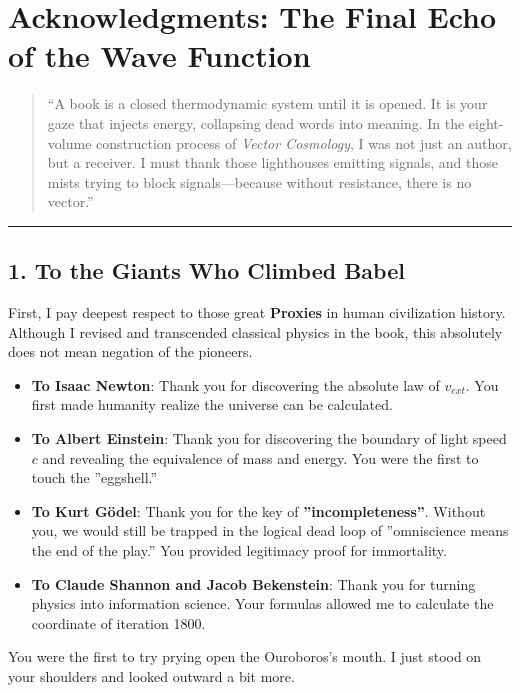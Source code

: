 \section*{Acknowledgments: The Final Echo of the Wave Function}

\begin{quote}
``A book is a closed thermodynamic system until it is opened. It is your gaze that injects energy, collapsing dead words into meaning. In the eight-volume construction process of \textit{Vector Cosmology}, I was not just an author, but a receiver. I must thank those lighthouses emitting signals, and those mists trying to block signals---because without resistance, there is no vector.''
\end{quote}

\hrule

\subsection{1. To the Giants Who Climbed Babel}

First, I pay deepest respect to those great \textbf{Proxies} in human civilization history. Although I revised and transcended classical physics in the book, this absolutely does not mean negation of the pioneers.

\begin{itemize}
\item \textbf{To Isaac Newton}: Thank you for discovering the absolute law of $v_{ext}$. You first made humanity realize the universe can be calculated.

\item \textbf{To Albert Einstein}: Thank you for discovering the boundary of light speed $c$ and revealing the equivalence of mass and energy. You were the first to touch the ''eggshell.''

\item \textbf{To Kurt Gödel}: Thank you for the key of \textbf{''incompleteness''}. Without you, we would still be trapped in the logical dead loop of ''omniscience means the end of the play.'' You provided legitimacy proof for immortality.

\item \textbf{To Claude Shannon and Jacob Bekenstein}: Thank you for turning physics into information science. Your formulas allowed me to calculate the coordinate of iteration 1800.
\end{itemize}

You were the first to try prying open the Ouroboros's mouth. I just stood on your shoulders and looked outward a bit more.

